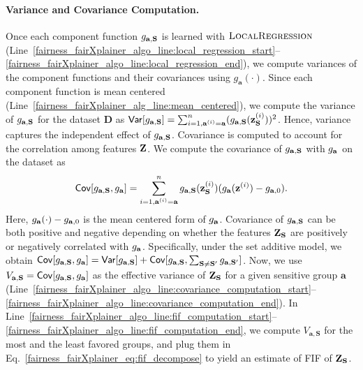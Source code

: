 \paragraph{Variance and Covariance Computation.} Once each component function $ g_{\mathbf{a}, \mathbf{S}} $ is learned with $ \textsc{LocalRegression} $ (Line~\ref{fairness_fairXplainer_algo_line:local_regression_start}--\ref{fairness_fairXplainer_algo_line:local_regression_end}), we compute variances of the component functions and their covariances using $g_\mathbf{a}(\cdot)$. Since each component function is mean centered (Line~\ref{fairness_fairXplainer_alg_line:mean_centered}), we compute the variance of $ g_{\mathbf{a}, \mathbf{S}} $ for the dataset $\mathbf{D}$ as
$  \mathsf{Var}[g_{\mathbf{a}, \mathbf{S}}] = \sum_{i=1, \mathbf{a}^{(i)} = \mathbf{a}}^n (g_{\mathbf{a}, \mathbf{S}}(\mathbf{z}_{\mathbf{S}}^{(i)}))^2 $. Hence, variance captures the independent effect of $ g_{\mathbf{a}, \mathbf{S}} $. Covariance is computed to account for the correlation among features $ \mathbf{Z} $. We compute the covariance of $ g_{\mathbf{a}, \mathbf{S}} $ with $ g_{\mathbf{a}} $ on the dataset as
\[
\label{fairness_fairXplainer_eq:covariance_computation}
	 \mathsf{Cov}[g_{\mathbf{a}, \mathbf{S}}, g_{\mathbf{a}}] = \sum_{i=1, \mathbf{a}^{(i)} = \mathbf{a}}^n g_{\mathbf{a}, \mathbf{S}}(\mathbf{z}_{\mathbf{S}}^{(i)})(g_\mathbf{a}(\mathbf{z}^{(i)}) - g_{\mathbf{a}, 0}). 
\]
Here, $ g_\mathbf{a}(\cdot) - g_{\mathbf{a}, 0} $ is the mean centered form of $ g_{\mathbf{a}} $. Covariance of $ g_{\mathbf{a}, \mathbf{S}} $ can be both positive and negative depending on whether the features $ \mathbf{Z}_{\mathbf{S}} $ are positively or negatively correlated with $ g_{\mathbf{a}} $. Specifically, under the set additive model, we obtain $ \mathsf{Cov}[g_{\mathbf{a}, \mathbf{S}}, g_{\mathbf{a}}] = \mathsf{Var}[g_{\mathbf{a}, \mathbf{S}}] + \mathsf{Cov}[g_{\mathbf{a}, \mathbf{S}}, \sum_{\mathbf{S} \ne \mathbf{S}'} g_{\mathbf{a}, \mathbf{S}'}] $. Now, we use $ V_{\mathbf{a}, \mathbf{S}} =  \mathsf{Cov}[g_{\mathbf{a}, \mathbf{S}}, g_{\mathbf{a}}] $ as the effective variance of $ \mathbf{Z}_{\mathbf{S}} $ for a given sensitive group $ \mathbf{a} $ (Line~\ref{fairness_fairXplainer_algo_line:covariance_computation_start}--\ref{fairness_fairXplainer_algo_line:covariance_computation_end}). In Line~\ref{fairness_fairXplainer_algo_line:fif_computation_start}--\ref{fairness_fairXplainer_algo_line:fif_computation_end}, we compute $ V_{\mathbf{a}, \mathbf{S}} $ for the most and the least favored groups, and plug them in Eq.~\eqref{fairness_fairXplainer_eq:fif_decompose} to yield an estimate of FIF of $ \mathbf{Z}_{\mathbf{S}} $.

